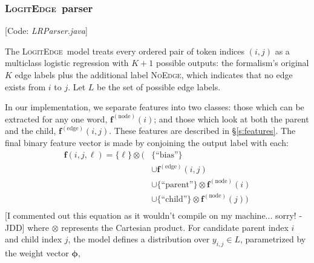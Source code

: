 \documentclass[11pt]{article}
\newcommand{\jdcomment}[1]{\textcolor{NavyBlue}{[#1 -JDD]}}
\newcommand{\codenote}[1]{\textcolor{PineGreen}{[Code: \emph{#1}]}}
\newcommand{\logitedge}{\textsc{LogitEdge}}
\newcommand{\noedge}{\textsc{NoEdge}}
\begin{document}
\subsubsection{\logitedge\ parser} \label{s:logitedge}


\codenote{LRParser.java}

The \logitedge\ model treats every ordered pair of token indices $(i, j)$ as a
multiclass logistic regression with $K+1$ possible outputs:
the formalism's original $K$ edge labels plus the additional label \noedge,
which indicates that no edge exists from $i$ to $j$.
Let $L$ be the set of possible edge labels.

In our implementation, we separate features into two classes:
those which can be extracted for any one word, $\bm{f}^{(\text{node})}(i)$;
and those which look at both the parent and the child,
$\bm{f}^{(\text{edge})}(i, j)$.
These features are described in \S\ref{s:features}.
The final binary feature vector is made by conjoining the output label with
each:
\begin{align*} 
\bm{f}(i, j, \ell) =
\{ \ell \} \otimes (& 
	\{ \text{``bias''} \} \\
	& \cup \bm{f}^{(\text{edge})}(i, j) \\
	& \cup \{ \text{``parent''} \} \otimes \bm{f}^{(\text{node})}(i) \\
	& \cup \{ \text{``child''} \} \otimes \bm{f}^{(\text{node})}(j)
)\\
\end{align*}
\jdcomment{I commented out this equation as it wouldn't compile on my machine... sorry!}
\noindent
where  $\otimes$ represents the Cartesian product.
For candidate parent index $i$ and child index $j$, the model defines a
distribution over $y_{i,j} \in L$, parametrized by the weight vector $\bm\phi$,
\end{document}
